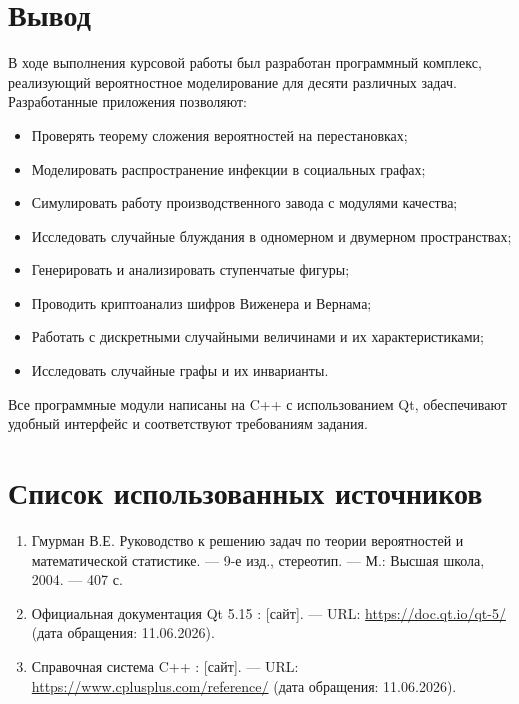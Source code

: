 \documentclass[a4paper]{article}
\theoremstyle{definition}
\begin{document}
\newpage

\section*{Вывод}

В ходе выполнения курсовой работы был разработан программный комплекс, реализующий вероятностное моделирование для десяти различных задач. Разработанные приложения позволяют:
\begin{itemize}
    \item Проверять теорему сложения вероятностей на перестановках;
    \item Моделировать распространение инфекции в социальных графах;
    \item Симулировать работу производственного завода с модулями качества;
    \item Исследовать случайные блуждания в одномерном и двумерном пространствах;
    \item Генерировать и анализировать ступенчатые фигуры;
    \item Проводить криптоанализ шифров Виженера и Вернама;
    \item Работать с дискретными случайными величинами и их характеристиками;
    \item Исследовать случайные графы и их инварианты.
\end{itemize}
Все программные модули написаны на C++ с использованием Qt, обеспечивают удобный интерфейс и соответствуют требованиям задания.

\section*{Список использованных источников}

\begin{enumerate}
    \item Гмурман В.Е. Руководство к решению задач по теории вероятностей и математической статистике. — 9-е изд., стереотип. — М.: Высшая школа, 2004. — 407 с.
    \item Официальная документация Qt 5.15 : [сайт]. — URL: \url{https://doc.qt.io/qt-5/} (дата обращения: 11.06.2026).
    \item Справочная система C++ : [сайт]. — URL: \url{https://www.cplusplus.com/reference/} (дата обращения: 11.06.2026).
\end{enumerate}
\end{document}
